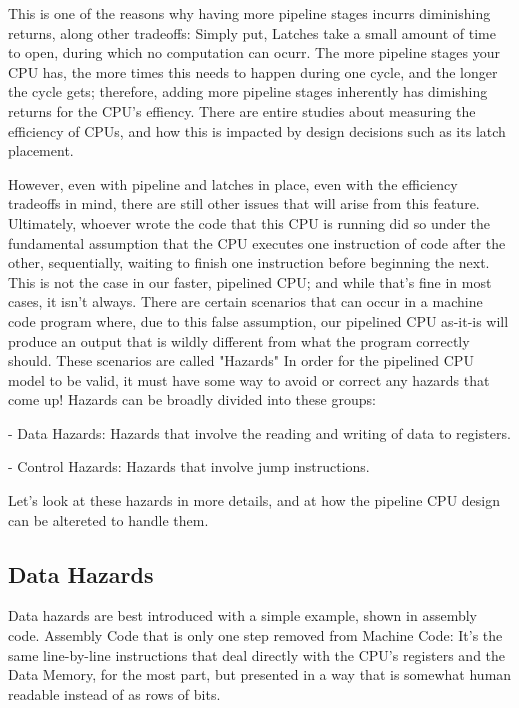 \documentclass[12pt,twoside]{reedthesis}
\begin{document}
This is one of the reasons why having more pipeline stages incurrs diminishing returns, along other tradeoffs: Simply put, Latches take a small amount of time to open, during which no computation can ocurr. The more pipeline stages your CPU has, the more times this needs to happen during one cycle, and the longer the cycle gets; therefore, adding more pipeline stages inherently has dimishing returns for the CPU's effiency. There are entire studies about measuring the efficiency of CPUs, and how this is impacted by design decisions such as its latch placement.

However, even with pipeline and latches in place, even with the efficiency tradeoffs in mind, there are still other issues that will arise from this feature. Ultimately, whoever wrote the code that this CPU is running did so under the fundamental assumption that the CPU executes one instruction of code after the other, sequentially, waiting to finish one instruction before beginning the next. This is not the case in our faster, pipelined CPU; and while that's fine in most cases, it isn't always. There are certain scenarios that can occur in a machine code program where, due to this false assumption, our pipelined CPU as-it-is will produce an output that is wildly different from what the program correctly should. These scenarios are called "Hazards" In order for the pipelined CPU model to be valid, it must  have some way to avoid or correct any hazards that come up! Hazards can be broadly divided into these groups:

- Data Hazards: Hazards that involve the reading and writing of data to registers.

- Control Hazards: Hazards that involve jump instructions.


Let's look at these hazards in more details, and at how the pipeline CPU design can be altereted to handle them.

\subsection{Data Hazards}

Data hazards are best introduced with a simple example, shown in assembly code. Assembly Code that is only one step removed from Machine Code: It's the same line-by-line instructions that deal directly with the CPU's registers and the Data Memory, for the most part, but presented in a way that is somewhat human readable instead of as rows of bits.
\end{document}
